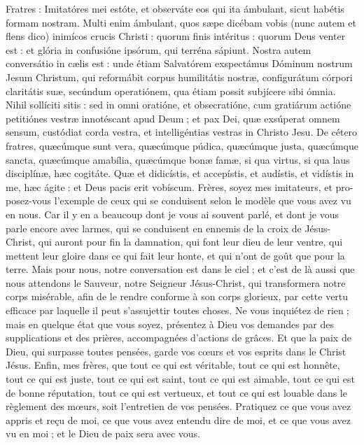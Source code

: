 \begin{paracol}{2}
Fratres : Imitatóres mei estóte, et observáte eos qui ita ámbulant, sicut habétis formam nostram. Multi enim ámbulant, quos sæpe dicébam vobis (nunc autem et flens dico) inimícos crucis Christi : quorum finis intéritus : quorum Deus venter est : et glória in confusióne ipsórum, qui terréna sápiunt. Nostra autem conversátio in cælis est : unde étiam Salvatórem exspectámus Dóminum nostrum Jesum Christum, qui reformábit corpus humilitátis nostræ, configurátum córpori claritátis suæ, secúndum operatiónem, qua étiam possit subjícere sibi ómnia. Nihil sollíciti sitis : sed in omni oratióne, et obsecratióne, cum gratiárum actióne petitiónes vestræ innotéscant apud Deum ; et pax Dei, quæ exsúperat omnem sensum, custódiat corda vestra, et intelligéntias vestras in Christo Jesu. De cétero fratres, quæcúmque sunt vera, quæcúmque púdica, quæcúmque justa, quæcúmque sancta, quæcúmque amabília, quæcúmque bonæ famæ, si qua virtus, si qua laus disciplínæ, hæc cogitáte. Quæ et didicístis, et accepístis, et audístis, et vidístis in me, hæc ágite : et Deus pacis erit vobíscum.
\switchcolumn
Frères, soyez mes imitateurs, et pro- posez-vous l’exemple de ceux qui se conduisent selon le modèle que vous avez vu en nous. Car il y en a beaucoup dont je vous ai souvent parlé, et dont je vous parle encore avec larmes, qui se conduisent en ennemis de la croix de Jésus-Christ, qui auront pour fin la damnation, qui font leur dieu de leur ventre, qui mettent leur gloire dans ce qui fait leur honte, et qui n’ont de goût que pour la terre. Mais pour nous, notre conversation est dans le ciel ; et c’est de là aussi que nous attendons le Sauveur, notre Seigneur Jésus-Christ, qui transformera notre corps misérable, afin de le rendre conforme à son corps glorieux, par cette vertu efficace par laquelle il peut s’assujettir toutes choses. Ne vous inquiétez de rien ; mais en quelque état que vous soyez, présentez à Dieu vos demandes par des supplications et des prières, accompagnées d’actions de grâces. Et que la paix de Dieu, qui surpasse toutes pensées, garde vos cœurs et vos esprits dans le Christ Jésus. Enfin, mes frères, que tout ce qui est véritable, tout ce qui est honnête, tout ce qui est juste, tout ce qui est saint, tout ce qui est aimable, tout ce qui est de bonne réputation, tout ce qui est vertueux, et tout ce qui est louable dans le règlement des mœurs, soit l’entretien de vos pensées. Pratiquez ce que vous avez appris et reçu de moi, ce que vous avez entendu dire de moi, et ce que vous avez vu en moi ; et le Dieu de paix sera avec vous.
\switchcolumn*


\end{paracol}

